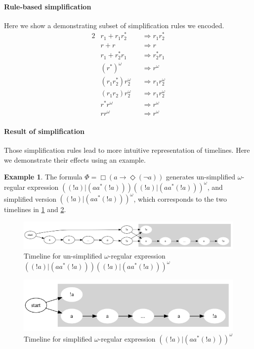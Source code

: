 \documentclass[preprint,12pt]{elsarticle}
\theoremstyle{definition}
\newtheorem{example}{Example}[section]
\theoremstyle{remark}
\newcommand{\always}{\Box}
\newcommand{\eventually}{\Diamond}
\newcommand{\limplies}{\rightarrow}
\begin{document}
\paragraph*{Rule-based simplification}
Here we show a demonstrating subset of simplification rules we encoded.
\begin{alignat*}{2}
        & r_1 + r_1r_2^* && \Longrightarrow r_1r_2^* \\
        & r + r && \Longrightarrow r \\
        & r_1 + r_2^*r_1 && \Longrightarrow r_2^*r_1 \\
        & (r^*)^{\omega} && \Longrightarrow r^{\omega} \\
        & (r_1r_2^*)r_2^{\omega} && \Longrightarrow r_1r_2^{\omega} \\
        & (r_1r_2)r_2^{\omega} && \Longrightarrow r_1r_2^{\omega} \\
        & r^*r^{\omega} && \Longrightarrow r^{\omega} \\
        & rr^{\omega} && \Longrightarrow r^{\omega}
\end{alignat*}

\paragraph*{Result of simplification}
Those simplification rules lead to more intuitive representation of timelines. Here we demonstrate their effects using an example.

\begin{example}
    The formula $\Phi = \always (a \limplies \eventually (\neg a))$ generates un-simplified $\omega$-regular expression $((!a) | (aa^*(!a)))((!a) | (aa^*(!a)))^{\omega}$, and simplified version $((!a) | (aa^*(!a)))^{\omega}$, which corresponds to the two timelines in \cref{fig:unsimplified} and \cref{fig:simplified}.
    \begin{figure}[h!]
        \centering
        \includegraphics[scale=0.3]{examples/ex9/ex9-unsimplified.png}
        \caption{Timeline for un-simplified $\omega$-regular expression $((!a) | (aa^*(!a)))((!a) | (aa^*(!a)))^{\omega}$}
        \label{fig:unsimplified}
    \end{figure}
    \begin{figure}[h!]
        \centering
        \includegraphics[scale=0.3]{examples/ex9/ex9.png}
        \caption{Timeline for simplified $\omega$-regular expression $((!a) | (aa^*(!a)))^{\omega}$}
        \label{fig:simplified}
    \end{figure}
\end{example}
\end{document}
